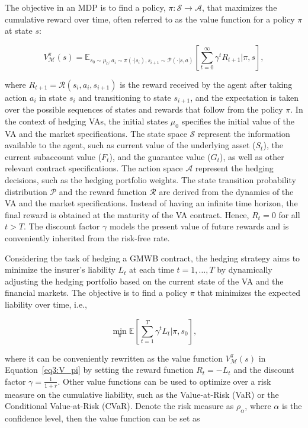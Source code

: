 The objective in an MDP is to find a policy, $\pi: \mathcal{S} \rightarrow \mathcal{A}$, that maximizes the cumulative reward over time, often referred to as the value function for a policy $\pi$ at state $s$: 

\begin{equation} \label{eq3:V_pi}
    V^{\pi}_{\mathcal{M}}(s) = \mathbb{E}_{s_0 \sim \mu_0, a_i \sim \pi(\cdot|s_i), s_{i+1} \sim \mathcal{P}(\cdot|s, a)} \left[ \sum_{t=0}^{\infty} \gamma^t R_{t+1} |\pi, s \right],
\end{equation}

where $R_{t+1} = \mathcal{R}(s_i, a_i, s_{i+1})$ is the reward received by the agent after taking action $a_i$ in state $s_i$ and transitioning to state $s_{i+1}$, and the expectation is taken over the possible sequences of states and rewards that follow from the policy $\pi$.
In the context of hedging VAs, the initial states $\mu_0$ specifies the initial value of the VA and the market specifications. 
The state space $\mathcal{S}$ represent the information available to the agent, such as current value of the underlying asset ($S_t$), the current subaccount value ($F_t$), and the guarantee value ($G_t$), as well as other relevant contract specifications.
The action space $\mathcal{A}$ represent the hedging decisions, such as the hedging portfolio weights.
The state transition probability distribution $\mathcal{P}$ and the reward function $\mathcal{R}$ are derived from the dynamics of the VA and the market specifications. Instead of having an infinite time horizon, the final reward is obtained at the maturity of the VA contract. Hence, $R_{t} = 0$ for all $t > T$.
The discount factor $\gamma$ models the present value of future rewards and is conveniently inherited from the risk-free rate. 

Considering the task of hedging a GMWB contract, the hedging strategy aims to minimize the insurer's liability $L_t$ at each time $t=1,\ldots,T$ by dynamically adjusting the hedging portfolio based on the current state of the VA and the financial markets. The objective is to find a policy $\pi$ that minimizes the expected liability over time, i.e., 

\begin{equation}
    \min_{\pi} \mathbb{E}[\sum_{t=1}^{T} \gamma^t L_t | \pi, s_0],
\end{equation}

where it can be conveniently rewritten as the value function $V^{\pi}_{\mathcal{M}}(s)$ in Equation~\ref{eq3:V_pi} by setting the reward function $R_{t} = -L_t$ and the discount factor $\gamma = \frac{1}{1+r}$. 
Other value functions can be used to optimize over a risk measure on the cumulative liability, such as the Value-at-Risk (VaR) or the Conditional Value-at-Risk (CVaR).
Denote the risk measure as $\rho_{\alpha}$, where $\alpha$ is the confidence level, then the value function can be set as

